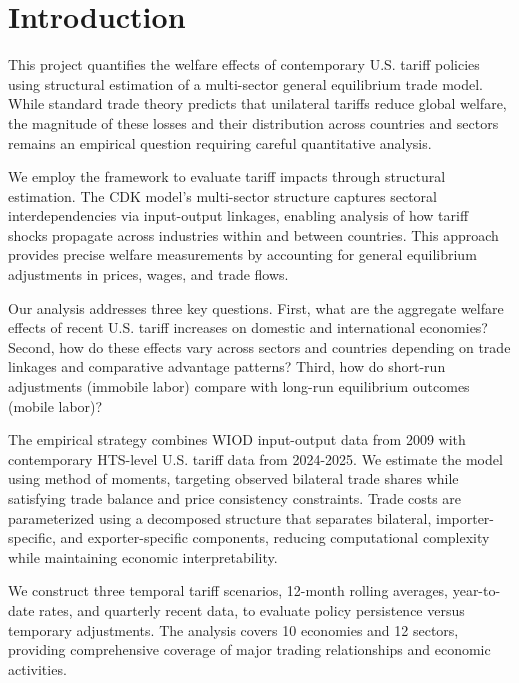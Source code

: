 \section{Introduction}

This project quantifies the welfare effects of contemporary U.S. tariff policies using structural estimation of a multi-sector general equilibrium trade model. While standard trade theory predicts that unilateral tariffs reduce global welfare, the magnitude of these losses and their distribution across countries and sectors remains an empirical question requiring careful quantitative analysis.

We employ the \cite{costinot2012TheReviewofEconomicStudies} framework to evaluate tariff impacts through structural estimation. The CDK model's multi-sector structure captures sectoral interdependencies via input-output linkages, enabling analysis of how tariff shocks propagate across industries within and between countries. This approach provides precise welfare measurements by accounting for general equilibrium adjustments in prices, wages, and trade flows.

Our analysis addresses three key questions. First, what are the aggregate welfare effects of recent U.S. tariff increases on domestic and international economies? Second, how do these effects vary across sectors and countries depending on trade linkages and comparative advantage patterns? Third, how do short-run adjustments (immobile labor) compare with long-run equilibrium outcomes (mobile labor)?

The empirical strategy combines WIOD input-output data from 2009 with contemporary HTS-level U.S. tariff data from 2024-2025. We estimate the model using method of moments, targeting observed bilateral trade shares while satisfying trade balance and price consistency constraints. Trade costs are parameterized using a decomposed structure that separates bilateral, importer-specific, and exporter-specific components, reducing computational complexity while maintaining economic interpretability.

We construct three temporal tariff scenarios, 12-month rolling averages, year-to-date rates, and quarterly recent data, to evaluate policy persistence versus temporary adjustments. The analysis covers 10 economies and 12 sectors, providing comprehensive coverage of major trading relationships and economic activities.
